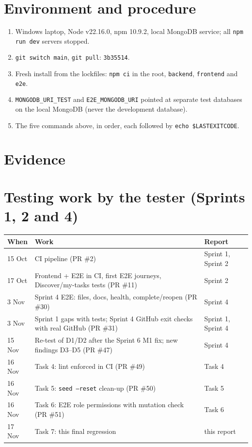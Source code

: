 \documentclass[11pt,a4paper]{article}
\begin{document}
\section{Environment and procedure}
\begin{enumerate}
\item Windows laptop, Node v22.16.0, npm 10.9.2, local MongoDB service; all \texttt{npm run dev} servers stopped.
\item \texttt{git switch main}, \texttt{git pull}: \texttt{3b35514}.
\item Fresh install from the lockfiles: \texttt{npm ci} in the root, \texttt{backend}, \texttt{frontend} and \texttt{e2e}.
\item \texttt{MONGODB\_URI\_TEST} and \texttt{E2E\_MONGODB\_URI} pointed at separate test databases on the local MongoDB (never the development database).
\item The five commands above, in order, each followed by \verb|echo $LASTEXITCODE|.
\end{enumerate}

\section{Evidence}

\section{Testing work by the tester (Sprints 1, 2 and 4)}
\begin{center}\small{}
\begin{tabularx}{\linewidth}{l X l}\toprule
\textbf{When} & \textbf{Work} & \textbf{Report}\\\midrule
15 Oct & CI pipeline (PR \#2) & Sprint 1, Sprint 2 \\
17 Oct & Frontend + E2E in CI, first E2E journeys, Discover/my-tasks tests (PR \#11) & Sprint 2 \\
3 Nov & Sprint 4 E2E: files, docs, health, complete/reopen (PR \#30) & Sprint 4 \\
3 Nov & Sprint 1 gaps with tests; Sprint 4 GitHub exit checks with real GitHub (PR \#31) & Sprint 1, Sprint 4 \\
15 Nov & Re-test of D1/D2 after the Sprint 6 M1 fix; new findings D3--D5 (PR \#47) & Sprint 4 \\
16 Nov & Task 4: lint enforced in CI (PR \#49) & Task 4 \\
16 Nov & Task 5: \texttt{seed --reset} clean-up (PR \#50) & Task 5 \\
16 Nov & Task 6: E2E role permissions with mutation check (PR \#51) & Task 6 \\
17 Nov & Task 7: this final regression & this report \\
\bottomrule\end{tabularx}\end{center}
\end{document}
